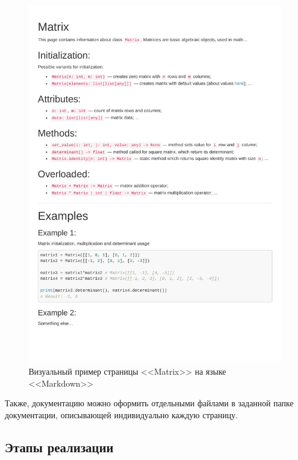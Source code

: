 	\begin{figure}[H]
		\centering
		\includegraphics[height=0.9\textheight]{additional/page.pdf}
		\caption{Визуальный пример страницы <<Matrix>> на языке <<Markdown>>}
	\end{figure}

	Также, документацию можно оформить отдельными файлами в заданной папке документации, описывающей индивидуально каждую страницу.


\subsection{Этапы реализации}

